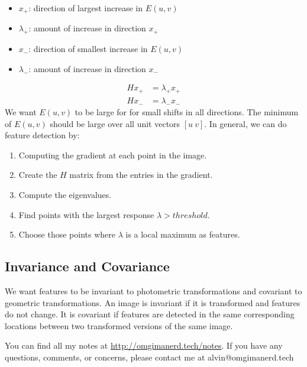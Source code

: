 \documentclass{math}
\begin{document}
\begin{itemize}
  \item \( x_+ \): direction of largest increase in \( E(u,v) \)
  \item \( \lambda_+ \): amount of increase in direction \( x_+ \)
  \item \( x_- \): direction of smallest increase in \( E(u,v) \)
  \item \( \lambda_- \): amount of increase in direction \( x_- \)
\end{itemize}
\begin{align*}
  Hx_+ &= \lambda_+x_+ \\
  Hx_- &= \lambda_-x_-
\end{align*}
We want \( E(u,v) \) to be large for for small shifts in all directions. The
minimum of \( E(u,v) \) should be large over all unit vectors \( [u\ v] \).
In general, we can do feature detection by:
\begin{enumerate}
  \item Computing the gradient at each point in the image.
  \item Create the \( H \) matrix from the entries in the gradient.
  \item Compute the eigenvalues.
  \item Find points with the largest response \( \lambda > threshold \).
  \item Choose those points where \( \lambda \) is a local maximum as features.
\end{enumerate}

\subsection*{Invariance and Covariance}
We want features to be invariant to photometric transformations and covariant
to geometric transformations. An image is invariant if it is transformed and
features do not change. It is covariant if features are detected in the same
corresponding locations between two transformed versions of the same image.

\begin{center}
  You can find all my notes at \url{http://omgimanerd.tech/notes}. If you have
  any questions, comments, or concerns, please contact me at
  alvin@omgimanerd.tech
\end{center}
\end{document}
